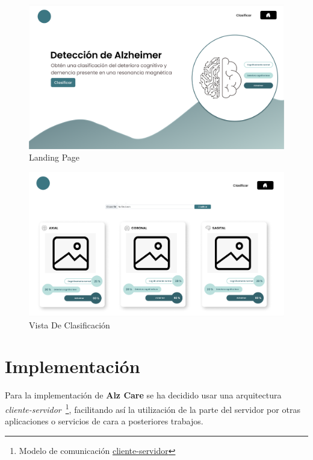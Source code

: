 \begin{figure}[H]
    \centering
    \includegraphics[width=\textwidth]{./imgs/app/landing-page}
    \caption{Landing Page}
    \label{fig:landing-page}
\end{figure}

\begin{figure}[H]
    \centering
    \includegraphics[width=\textwidth]{./imgs/app/vista-clasificacion}
    \caption{Vista De Clasificación}
    \label{fig:vista-clasificacion}
\end{figure}

\section{Implementación}\label{sec:implementacion}
Para la implementación de \textbf{Alz Care} se ha decidido usar una arquitectura
\textit{cliente-servidor}~\footnote{Modelo de comunicación \href{https://definicion.de/cliente-servidor/}{cliente-servidor}}, facilitando
así la utilización de la parte del servidor por otras aplicaciones o servicios de cara a posteriores trabajos.

